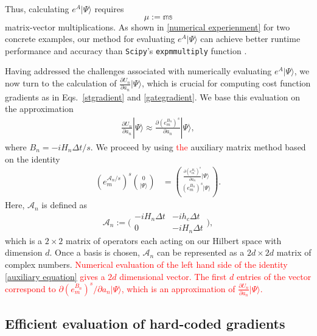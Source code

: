 \documentclass[letterpaper,10pt]{iopart}
\newcommand{\dket}[1]{|#1\rangle}
\newcommand\revise[1]{\textcolor{red}{#1}}
\begin{document}
Thus, calculating $e^A\dket{\Psi}$ requires
\begin{equation}
\label{mudefnition}
    \mu:=\mathbb{m}\mathbb{s}
\end{equation}
matrix-vector multiplications. As shown in   \ref{numerical experienment} for two concrete examples, our method for evaluating $e^A\dket{\Psi}$ can achieve better runtime performance and accuracy than \texttt{Scipy}'s \texttt{expm\textunderscore multiply} function \cite{al2011computing} .

Having addressed the challenges associated with numerically evaluating $e^A\dket{\Psi}$, we now turn to the calculation of $\frac{\partial U_n}{\partial a_n} \dket{\Psi}$, which is crucial for computing cost function gradients as in Eqs.\ \eqref{stgradient} and \eqref{gategradient}. We base this evaluation on the approximation 
\begin{align}
    \frac{\partial U_n}{\partial a_n} \dket{\Psi}\approx \frac{\partial (e^{B_n}_m)^s}{\partial a_n} \dket{\Psi},
\end{align}
where $B_n={-iH_n\Delta t}/{s}$. We proceed by using \revise{ the} auxiliary matrix method based on the identity \cite{auxigoodwin2015auxiliary,najfeld1995derivatives}
\begin{equation}
\label{auxiliary equation}
    \begin{aligned}
    (e^{\mathcal{A}_n/s}_m)^s
    \binom{0}{|\Psi\rangle}&=
    \binom{
    \frac{\partial (e^{B_{n}}_m)^s}{\partial a_n}  \dket{\Psi}}{{(e^{B_n}_m)^s|\Psi\rangle}}.
\end{aligned}
\end{equation}
Here, $\mathcal{A}_n$ is defined as
\begin{equation}
\mathcal{A}_n:=
{\biggl(\begin{matrix}
-iH_n \Delta t& -ih_c\Delta t \\
0 & -iH_n\Delta t
\end{matrix}\biggr)},
\end{equation}
which is a $2\times2$ matrix of operators each acting on our Hilbert space with dimension $d$. Once a basis is chosen, $\mathcal{A}_n$ can be represented as a $2d\times2d$ matrix of complex numbers. \revise{Numerical evaluation of the left hand side of the identity \eqref{auxiliary equation} gives a $2d$ dimensional vector. The first $d$ entries of the vector correspond to $\partial (e^{B_n}_m)^s / \partial a_n \dket{\Psi}$, which is an approximation of $\frac{\partial U_n}{\partial a_n} \dket{\Psi}$.  }
\subsection{Efficient evaluation of hard-coded gradients}
\label{Computationally and memory efficient algorithm}
\end{document}
